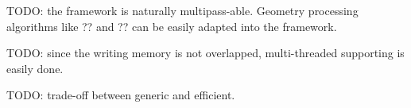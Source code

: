 



TODO: the framework is naturally multipass-able. Geometry processing 
algorithms like ?? and ?? can be easily adapted into the framework.

TODO: since the writing memory is not overlapped, multi-threaded
supporting is easily done.

TODO: trade-off between generic and efficient. 
 
